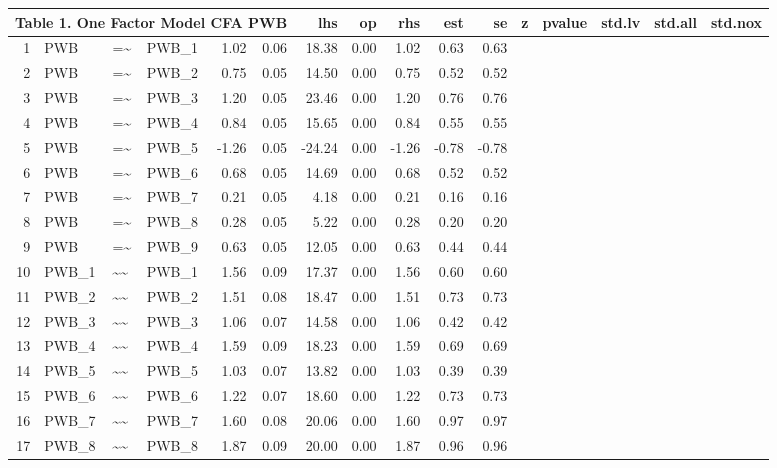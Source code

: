 \documentclass{article}
\begin{document}


\begin{table}[ht]
\centering
\begin{tabular}{rlllrrrrrrr}
 \multicolumn{ 6 }{l}{ Table 1. One Factor Model CFA PWB} \cr 
  \hline
 & lhs & op & rhs & est & se & z & pvalue & std.lv & std.all & std.nox \\ 
  \hline
1 & PWB & =\~{} & PWB\_1 & 1.02 & 0.06 & 18.38 & 0.00 & 1.02 & 0.63 & 0.63 \\ 
  2 & PWB & =\~{} & PWB\_2 & 0.75 & 0.05 & 14.50 & 0.00 & 0.75 & 0.52 & 0.52 \\ 
  3 & PWB & =\~{} & PWB\_3 & 1.20 & 0.05 & 23.46 & 0.00 & 1.20 & 0.76 & 0.76 \\ 
  4 & PWB & =\~{} & PWB\_4 & 0.84 & 0.05 & 15.65 & 0.00 & 0.84 & 0.55 & 0.55 \\ 
  5 & PWB & =\~{} & PWB\_5 & -1.26 & 0.05 & -24.24 & 0.00 & -1.26 & -0.78 & -0.78 \\ 
  6 & PWB & =\~{} & PWB\_6 & 0.68 & 0.05 & 14.69 & 0.00 & 0.68 & 0.52 & 0.52 \\ 
  7 & PWB & =\~{} & PWB\_7 & 0.21 & 0.05 & 4.18 & 0.00 & 0.21 & 0.16 & 0.16 \\ 
  8 & PWB & =\~{} & PWB\_8 & 0.28 & 0.05 & 5.22 & 0.00 & 0.28 & 0.20 & 0.20 \\ 
  9 & PWB & =\~{} & PWB\_9 & 0.63 & 0.05 & 12.05 & 0.00 & 0.63 & 0.44 & 0.44 \\ 
  10 & PWB\_1 & \~{}\~{} & PWB\_1 & 1.56 & 0.09 & 17.37 & 0.00 & 1.56 & 0.60 & 0.60 \\ 
  11 & PWB\_2 & \~{}\~{} & PWB\_2 & 1.51 & 0.08 & 18.47 & 0.00 & 1.51 & 0.73 & 0.73 \\ 
  12 & PWB\_3 & \~{}\~{} & PWB\_3 & 1.06 & 0.07 & 14.58 & 0.00 & 1.06 & 0.42 & 0.42 \\ 
  13 & PWB\_4 & \~{}\~{} & PWB\_4 & 1.59 & 0.09 & 18.23 & 0.00 & 1.59 & 0.69 & 0.69 \\ 
  14 & PWB\_5 & \~{}\~{} & PWB\_5 & 1.03 & 0.07 & 13.82 & 0.00 & 1.03 & 0.39 & 0.39 \\ 
  15 & PWB\_6 & \~{}\~{} & PWB\_6 & 1.22 & 0.07 & 18.60 & 0.00 & 1.22 & 0.73 & 0.73 \\ 
  16 & PWB\_7 & \~{}\~{} & PWB\_7 & 1.60 & 0.08 & 20.06 & 0.00 & 1.60 & 0.97 & 0.97 \\ 
  17 & PWB\_8 & \~{}\~{} & PWB\_8 & 1.87 & 0.09 & 20.00 & 0.00 & 1.87 & 0.96 & 0.96 \\ 

\end{tabular}
\end{table}
\end{document}
